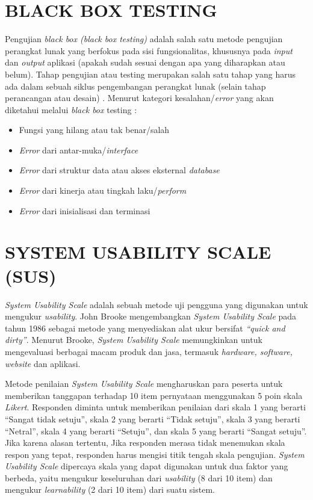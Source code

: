 \section{\uppercase{Black Box Testing}}
Pengujian \textit{black box (black box testing)} adalah salah satu metode pengujian perangkat lunak yang berfokus pada sisi fungsionalitas, khususnya pada \textit{input} dan \textit{output} aplikasi (apakah sudah sesuai dengan apa yang diharapkan atau belum). Tahap pengujian atau testing merupakan salah satu tahap yang harus ada dalam sebuah siklus pengembangan perangkat lunak (selain tahap perancangan atau desain) \citep{iskandaria2012}. Menurut \cite{shihab2011} kategori kesalahan/\textit{error} yang akan diketahui melalui \textit{black box} testing :

\begin{itemize}
\item Fungsi yang hilang atau tak benar/salah
\item \textit{Error} dari antar-muka/\textit{interface}
\item \textit{Error} dari struktur data atau akses eksternal \textit{database}
\item \textit{Error} dari kinerja atau tingkah laku/\textit{perform}
\item \textit{Error} dari inisialisasi dan terminasi
\end{itemize}


\section{\uppercase{System Usability Scale (SUS)}}
\textit{System Usability Scale} adalah sebuah metode uji pengguna yang digunakan untuk mengukur \textit{usability}. John Brooke mengembangkan \textit{System Usability Scale} pada tahun 1986 sebagai metode yang menyediakan alat ukur bersifat \textit{“quick and dirty”}. Menurut Brooke, \textit{System Usability Scale} memungkinkan untuk mengevaluasi berbagai macam produk dan jasa, termasuk \textit{hardware, software, website} dan aplikasi. 

\par Metode penilaian \textit{System Usability Scale} mengharuskan para peserta untuk memberikan tanggapan terhadap 10 item pernyataan menggunakan 5 poin skala \textit{Likert}. Responden diminta untuk memberikan penilaian dari skala 1 yang berarti “Sangat tidak setuju”, skala 2 yang berarti “Tidak setuju”, skala 3 yang berarti “Netral”, skala 4 yang berarti “Setuju”, dan skala 5 yang berarti “Sangat setuju”. Jika karena alasan tertentu, Jika responden merasa tidak menemukan skala respon yang tepat, responden harus mengisi titik tengah skala pengujian. \textit{System Usability Scale} dipercaya skala yang dapat digunakan untuk dua faktor yang berbeda, yaitu mengukur keseluruhan dari \textit{usability} (8 dari 10 item) dan mengukur \textit{learnability} 
(2 dari 10 item) dari suatu sistem. 


